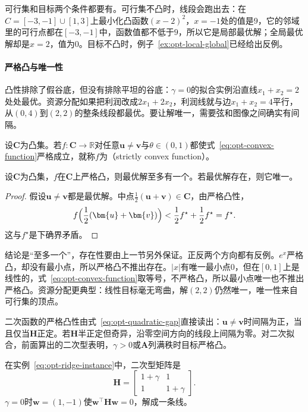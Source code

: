 可行集和目标两个条件都要有。可行集不凸时，线段会跑出去：在$C=[-3,-1]\cup[1,3]$上最小化凸函数$(x-2)^2$，$x=-1$处的值是$9$，它的邻域里的可行点都在$[-3,-1]$中，函数值都不低于$9$，所以它是局部最优解；全局最优解却是$x=2$，值为$0$。目标不凸时，例子~\ref{ex:opt-local-global}已经给出反例。

\paragraph{严格凸与唯一性}
凸性排除了假谷底，但没有排除平坦的谷底：$\gamma=0$的拟合实例沿直线$x_1+x_2=2$处处最优。资源分配如果把利润改成$2x_1+2x_2$，利润线就与边$x_1+x_2=4$平行，从$(0,4)$到$(2,2)$的整条线段都最优。要让解唯一，需要弦和图像之间确实有间隔。

\begin{definition}[严格凸函数]
\label{def:opt-strict-convex}
设$\bm{C}$为凸集。若$f:\bm{C}\to\mathbb{R}$对任意$\bm{u}\neq\bm{v}$与$\theta\in(0,1)$都使式~\eqref{eq:opt-convex-function}严格成立，就称$f$为（strictly convex function）。
\end{definition}

\begin{theorem}[严格凸目标至多有一个最小点]
\label{thm:opt-strict-unique}
设$\bm{C}$为凸集，$f$在$\bm{C}$上严格凸，则最优解至多有一个。若最优解存在，则它唯一。
\end{theorem}

\begin{proof}
假设$\bm{u}\neq\bm{v}$都是最优解。中点$\frac12(\bm{u}+\bm{v})\in\bm{C}$，由严格凸性，
\[
 f\Bigl(\frac12(\bm{u}+\bm{v})\Bigr)<\frac12f^\star+\frac12f^\star=f^\star.
\]
这与$f^\star$是下确界矛盾。
\end{proof}

结论是“至多一个”，存在性要由上一节另外保证。正反两个方向都有反例。$e^x$严格凸，却没有最小点，所以严格凸不推出存在。$\lvert x\rvert$有唯一最小点$0$，但在$[0,1]$上是线性的，式~\eqref{eq:opt-convex-function}取等号，不严格凸，所以最小点唯一也不推出严格凸。资源分配更典型：线性目标毫无弯曲，解$(2,2)$仍然唯一，唯一性来自可行集的顶点。

二次函数的严格凸性由式~\eqref{eq:opt-quadratic-gap}直接读出：$\bm{u}\neq\bm{v}$时间隔为正，当且仅当$\bm{H}$正定。若$\bm{H}$半正定但奇异，沿零空间方向的线段上间隔为零。对二次拟合，前面算出的二次型表明，$\gamma>0$或$\bm{A}$列满秩时目标严格凸。

在实例~\eqref{eq:opt-ridge-instance}中，二次型矩阵是
\[
 \bm{H}=\begin{bmatrix}1+\gamma&1\\1&1+\gamma\end{bmatrix}.
\]
$\gamma=0$时$\bm{w}=(1,-1)$使$\bm{w}^\top\bm{H}\bm{w}=0$，解成一条线。

